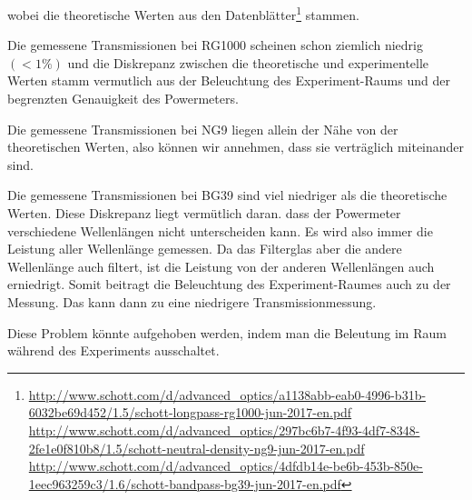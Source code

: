 		wobei die theoretische Werten aus den Datenblätter\footnote{
			\href{http://www.schott.com/d/advanced_optics/a1138abb-eab0-4996-b31b-6032be69d452/1.5/schott-longpass-rg1000-jun-2017-en.pdf}{http://www.schott.com/d/advanced\_optics/a1138abb-eab0-4996-b31b-6032be69d452/1.5/schott-longpass-rg1000-jun-2017-en.pdf}\\
			\href{http://www.schott.com/d/advanced_optics/297bc6b7-4f93-4df7-8348-2fe1e0f810b8/1.5/schott-neutral-density-ng9-jun-2017-en.pdf}{http://www.schott.com/d/advanced\_optics/297bc6b7-4f93-4df7-8348-2fe1e0f810b8/1.5/schott-neutral-density-ng9-jun-2017-en.pdf} \\
			\href{http://www.schott.com/d/advanced_optics/4dfdb14e-be6b-453b-850e-1eec963259c3/1.6/schott-bandpass-bg39-jun-2017-en.pdf}{http://www.schott.com/d/advanced\_optics/4dfdb14e-be6b-453b-850e-1eec963259c3/1.6/schott-bandpass-bg39-jun-2017-en.pdf}
		} stammen.

		Die gemessene Transmissionen bei RG1000 scheinen schon ziemlich niedrig $(< 1\%)$ und die Diskrepanz zwischen die theoretische und experimentelle Werten stamm vermutlich aus der Beleuchtung des Experiment-Raums und der begrenzten Genauigkeit des Powermeters.

		Die gemessene Transmissionen bei NG9 liegen allein der Nähe von der theoretischen Werten, also können wir annehmen, dass sie verträglich miteinander sind. 

		Die gemessene Transmissionen bei BG39 sind viel niedriger als die theoretische Werten. Diese Diskrepanz liegt vermütlich daran. dass der Powermeter verschiedene Wellenlängen nicht unterscheiden kann. Es wird also immer die Leistung aller Wellenlänge gemessen. Da das Filterglas aber die andere Wellenlänge auch filtert, ist die Leistung von der anderen Wellenlängen auch erniedrigt. Somit beitragt die Beleuchtung des Experiment-Raumes auch zu der Messung. Das kann dann zu eine niedrigere Transmissionmessung. 

		Diese Problem könnte aufgehoben werden, indem man die Beleutung im Raum während des Experiments ausschaltet. 

